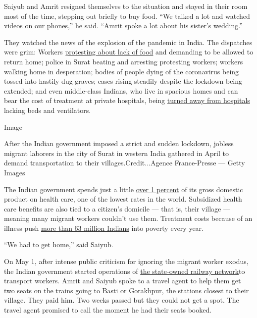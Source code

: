 Saiyub and Amrit resigned themselves to the situation and stayed in
their room most of the time, stepping out briefly to buy food. ``We
talked a lot and watched videos on our phones,'' he said. ``Amrit spoke
a lot about his sister's wedding.''

They watched the news of the explosion of the pandemic in India. The
dispatches were grim: Workers
\href{https://www.thehindu.com/news/national/other-states/migrant-workers-in-surat-take-to-the-streets-again/article31341846.ece}{protesting
about lack of food} and demanding to be allowed to return home; police
in Surat beating and arresting protesting workers; workers walking home
in desperation; bodies of people dying of the coronavirus being tossed
into hastily dug graves; cases rising steadily despite the lockdown
being extended; and even middle-class Indians, who live in spacious
homes and can bear the cost of treatment at private hospitals, being
\href{https://www.nytimes.com/2020/06/21/world/asia/coronavirus-india-hospitals-pregnant.html}{turned
away from hospitals} lacking beds and ventilators.

Image

After the Indian government imposed a strict and sudden lockdown,
jobless migrant laborers in the city of Surat in western India gathered
in April to demand transportation to their villages.Credit...Agence
France-Presse --- Getty Images

The Indian government spends just a little
\href{https://main.mohfw.gov.in/sites/default/files/NHA_Estimates_Report_2015-16_0.pdf}{over
1 percent} of its gross domestic product on health care, one of the
lowest rates in the world. Subsidized health care benefits are also tied
to a citizen's domicile --- that is, their village --- meaning many
migrant workers couldn't use them. Treatment costs because of an illness
push
\href{https://www.indiaspend.com/wp-content/uploads/2020/06/Draft_National_Hea_2263179a.pdf}{more
than 63 million Indians} into poverty every year.

``We had to get home,'' said Saiyub.

On May 1, after intense public criticism for ignoring the migrant worker
exodus, the Indian government started operations of
\href{https://timesofindia.indiatimes.com/videos/news/covid-19-lockdown-indian-railways-starts-first-special-train-for-migrant-workers-from-hyderabad-to-jharkhand/videoshow/75487379.cms}{the
state-owned railway network}to transport workers. Amrit and Saiyub spoke
to a travel agent to help them get two seats on the trains going to
Basti or Gorakhpur, the stations closest to their village. They paid
him. Two weeks passed but they could not get a spot. The travel agent
promised to call the moment he had their seats booked.

